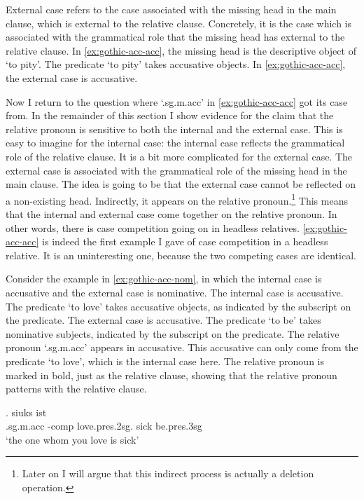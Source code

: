 External case refers to the case associated with the missing head in the main clause, which is external to the relative clause. Concretely, it is the case which is associated with the grammatical role that the missing head has external to the relative clause. In \ref{ex:gothic-acc-acc}, the missing head is the descriptive object of  `to pity'. The predicate  `to pity' takes accusative objects. In \ref{ex:gothic-acc-acc}, the external case is accusative.

Now I return to the question where  `.\ac{sg}.\ac{m}.\ac{acc}' in \ref{ex:gothic-acc-acc} got its case from. In the remainder of this section I show evidence for the claim that the relative pronoun is sensitive to both the internal and the external case.
This is easy to imagine for the internal case: the internal case reflects the grammatical role of the relative clause. It is a bit more complicated for the external case. The external case is associated with the grammatical role of the missing head in the main clause. The idea is going to be that the external case cannot be reflected on a non-existing head. Indirectly, it appears on the relative pronoun.\footnote{
Later on I will argue that this indirect process is actually a deletion operation.
}
This means that the internal and external case come together on the relative pronoun. In other words, there is case competition going on in headless relatives. \ref{ex:gothic-acc-acc} is indeed the first example I gave of case competition in a headless relative. It is an uninteresting one, because the two competing cases are identical.

Consider the example in \ref{ex:gothic-acc-nom}, in which the internal case is accusative and the external case is nominative.
The internal case is accusative. The predicate  `to love' takes accusative objects, as indicated by the subscript on the predicate.
The external case is accusative. The predicate  `to be' takes nominative subjects, indicated by the subscript on the predicate.
The relative pronoun  `.\ac{sg}.\ac{m}.\ac{acc}' appears in accusative. This accusative can only come from the predicate  `to love', which is the internal case here. The relative pronoun is marked in bold, just as the relative clause, showing that the relative pronoun patterns with the relative clause.

\exg.    siuks ist\\
 .\ac{sg}.\ac{m}.\ac{acc} -\ac{comp} love.\ac{pres}.2\ac{sg}.\scsub{[acc]} sick be.\ac{pres}.3\ac{sg}\scsub{[nom]}\\
 `the one whom you love is sick' \label{ex:gothic-acc-nom}

